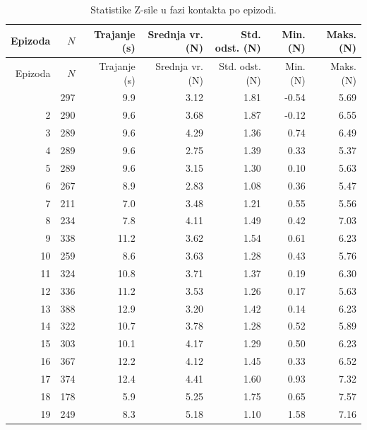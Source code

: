 \begin{longtable}{rrrrrrr}
  \caption{Statistike Z-sile u fazi kontakta po epizodi.}
  \label{tab:contact_forces} \\
  \toprule
  Epizoda & $N$ & Trajanje (s) & Srednja vr. (N) & Std. odst. (N) & Min. (N) & Maks. (N) \\
  \midrule
  \endfirsthead
  \toprule
  Epizoda & $N$ & Trajanje (s) & Srednja vr. (N) & Std. odst. (N) & Min. (N) & Maks. (N) \\
  \midrule
  \endhead
  \midrule
  \endfoot
  \bottomrule
  \endlastfoot
  1   &  297 &   9.9 &    3.12 &   1.81 &    -0.54 &    5.69 \\
  2   &  290 &   9.6 &    3.68 &   1.87 &    -0.12 &    6.55 \\
  3   &  289 &   9.6 &    4.29 &   1.36 &     0.74 &    6.49 \\
  4   &  289 &   9.6 &    2.75 &   1.39 &     0.33 &    5.37 \\
  5   &  289 &   9.6 &    3.15 &   1.30 &     0.10 &    5.63 \\
  6   &  267 &   8.9 &    2.83 &   1.08 &     0.36 &    5.47 \\
  7   &  211 &   7.0 &    3.48 &   1.21 &     0.55 &    5.56 \\
  8   &  234 &   7.8 &    4.11 &   1.49 &     0.42 &    7.03 \\
  9   &  338 &  11.2 &    3.62 &   1.54 &     0.61 &    6.23 \\
  10  &  259 &   8.6 &    3.63 &   1.28 &     0.43 &    5.76 \\
  11  &  324 &  10.8 &    3.71 &   1.37 &     0.19 &    6.30 \\
  12  &  336 &  11.2 &    3.53 &   1.26 &     0.17 &    5.63 \\
  13  &  388 &  12.9 &    3.20 &   1.42 &     0.14 &    6.23 \\
  14  &  322 &  10.7 &    3.78 &   1.28 &     0.52 &    5.89 \\
  15  &  303 &  10.1 &    4.17 &   1.29 &     0.50 &    6.23 \\
  16  &  367 &  12.2 &    4.12 &   1.45 &     0.33 &    6.52 \\
  17  &  374 &  12.4 &    4.41 &   1.60 &     0.93 &    7.32 \\
  18  &  178 &   5.9 &    5.25 &   1.75 &     0.65 &    7.57 \\
  19  &  249 &   8.3 &    5.18 &   1.10 &     1.58 &    7.16 \\

\end{longtable}

